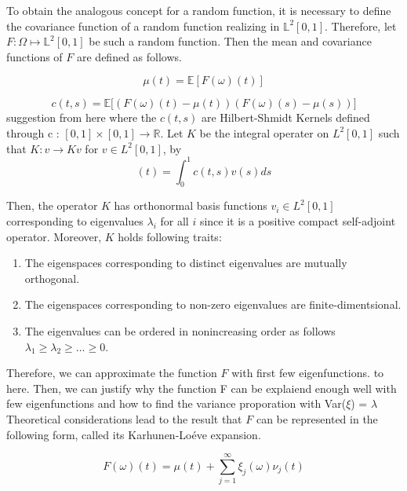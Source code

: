 \documentclass[11pt,twoside,a4paper]{article}
\begin{document}
	To obtain the analogous concept for a random function, it is necessary to define the covariance function of a random function realizing in $\mathbb{L}^2[0,1]$. Therefore, let $F: \Omega \mapsto \mathbb{L}^2[0,1]$ be such a random function.
	Then the mean and covariance functions of $F$ are defined as follows.
	
	\begin{equation}\label{MeanFunction}
		\mu(t) = \mathbb{E}\left[ F(\omega)(t) \right]
	\end{equation}
	
	\begin{equation}\label{CovarianceFunction}
		c(t,s) = \mathbb{E}\big[ \left( F(\omega)(t) - \mu(t) \right) \left( F(\omega)(s) - \mu(s) \right) \big]
	\end{equation}
	{\color{orange}suggestion from here}
	where the $c(t,s)$ are Hilbert-Shmidt Kernels defined through c : $[0,1] \times [0,1] \rightarrow \mathbb{R}$. Let $K$ be the integral operater on $L^{2}[0,1]$ such that $K : v \rightarrow Kv$ for $v \in L^{2}[0,1]$, by
	\begin{equation}
		[Kv](t) = \int_{0}^{1}c(t,s)v(s)ds
	\end{equation}

	Then, the operator $K$ has orthonormal basis functions $v_{i} \in L^{2}[0,1]$ corresponding to eigenvalues $\lambda_{i}$ for all $i$ since it is a positive compact self-adjoint operator. Moreover, $K$ holds following traits:
	
		\begin{enumerate}
			\item The eigenspaces corresponding to distinct eigenvalues are mutually orthogonal.
			\item The eigenspaces corresponding to non-zero eigenvalues are finite-dimentsional.
			\item The eigenvalues can be ordered in nonincreasing order as follows $\lambda_{1} \geq \lambda_{2} \geq \dots \geq 0$.
		\end{enumerate}
	
	Therefore, we can approximate the function $F$ with first few eigenfunctions. {\color{orange}to here. Then, we can justify why the function F can be explaiend enough well with few eigenfunctions and how to find the variance proporation with Var($\xi$) = $\lambda$}
	Theoretical considerations lead to the result that $F$ can be represented in the following form, called its Karhunen-Lo\'{e}ve expansion.
	
	\begin{equation}\label{KarhunenLoeve}
		F(\omega)(t) = \mu(t) + \sum_{j = 1}^{\infty} \xi_j(\omega) \nu_j(t)
	\end{equation}
\end{document}
